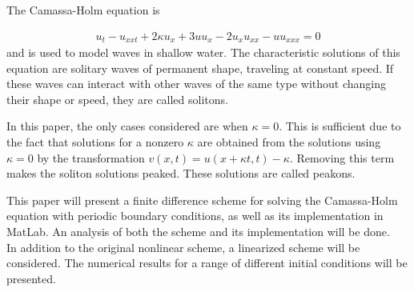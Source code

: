 The Camassa-Holm equation is

\begin{align}
u_{t} - u_{xxt} + 2\kappa u_{x} + 3uu_{x} - 2u_{x}u_{xx} - uu_{xxx} = 0
\end{align}
and is used to model waves in shallow water. The characteristic solutions of this equation are solitary waves of permanent shape, traveling at constant speed. If these waves can interact with other waves of the same type without changing their shape or speed, they are called solitons. 

In this paper, the only cases considered are when $\kappa = 0$. This is sufficient due to the fact that solutions for a nonzero $\kappa$ are obtained from the solutions using $\kappa = 0$ by the transformation $v(x,t) = u(x + \kappa t, t) - \kappa$. Removing this term makes the soliton solutions peaked. These solutions are called peakons.

This paper will present a finite difference scheme for solving the Camassa-Holm equation with periodic boundary conditions, as well as its implementation in MatLab. An analysis of both the scheme and its implementation will be done. \\
In addition to the original nonlinear scheme, a linearized scheme will be considered. The numerical results for a range of different initial conditions will be presented. 